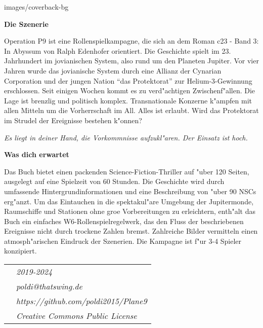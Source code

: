 \begin{backcover}{images/coverback-bg}

    \vspace{5mm}
    \textbf{Die Szenerie}

    Operation P9 ist eine Rollenspielkampagne, die sich an dem Roman c23 - Band 3: In Abyssum von Ralph Edenhofer orientiert. Die Geschichte spielt im 23. Jahrhundert im jovianischen System, also rund um den Planeten Jupiter. Vor vier Jahren wurde das jovianische System durch eine Allianz der Cynarian Corporation und der jungen Nation ``das Protektorat'' zur Helium-3-Gewinnung erschlossen. Seit einigen Wochen kommt es zu verd"achtigen Zwischenf"allen. Die Lage ist brenzlig und politisch komplex. Transnationale Konzerne k"ampfen mit allen Mitteln um die Vorherrschaft im All. Alles ist erlaubt. Wird das Protektorat im Strudel der Ereignisse bestehen k"onnen?

    \medskip
    \emph{Es liegt in deiner Hand, die Vorkommnisse aufzukl"aren. Der Einsatz ist hoch.}

    \vspace{5mm}
    \textbf{Was dich erwartet}

    Das Buch bietet einen packenden Science-Fiction-Thriller auf "uber 120 Seiten, ausgelegt auf eine Spielzeit von 60 Stunden. Die Geschichte wird durch umfassende Hintergrundinformationen und eine Beschreibung von "uber 90 NSCs erg"anzt. Um das Eintauchen in die spektakul"are Umgebung der Jupitermonde, Raumschiffe und Stationen ohne gro\3e Vorbereitungen zu erleichtern, enth"alt das Buch ein einfaches W6-Rollenspielregelwerk, das den Fluss der beschriebenen Ereignisse nicht durch trockene Zahlen bremst. Zahlreiche Bilder vermitteln einen atmosph"arischen Eindruck der Szenerien. Die Kampagne ist f"ur 3-4 Spieler konzipiert.

    \vspace{15mm}
    \newcommand{\footerentry}[1]{\textit{\normalsize{}{#1}}}
    \begin{tabularx}{\textwidth} {
        >{\raggedright\arraybackslash}X
        >{\raggedleft\arraybackslash}X
    }
        & \footerentry{2019-2024} \\
        & \footerentry{poldi@thatswing.de}\\
        & \footerentry{https://github.com/poldi2015/Plane9}\\
        & \footerentry{Creative Commons Public License} 
    \end{tabularx}

\end{backcover}
